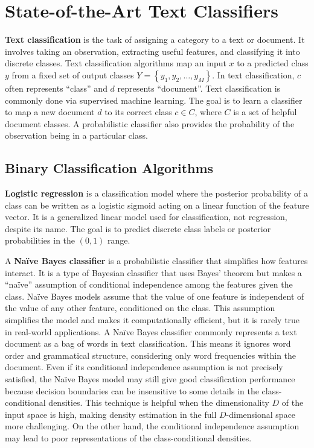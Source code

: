 \section{State-of-the-Art Text Classifiers}\label{sec:state-of-the-art-text-classifiers}
\textbf{Text classification} is the task of assigning a category to a text or document. It involves taking an observation, extracting useful features, and classifying it into discrete classes. Text classification algorithms map an input $x$ to a predicted class $y$ from a fixed set of output classes $Y = \left\{y_1, y_2, \dots, y_M\right\}$. In text classification, $c$ often represents ``class'' and $d$ represents ``document''. Text classification is commonly done via supervised machine learning. The goal is to learn a classifier to map a new document $d$ to its correct class $c \in C$, where $C$ is a set of helpful document classes. A probabilistic classifier also provides the probability of the observation being in a particular class. \cite{jurafsky2025}

\subsection{Binary Classification Algorithms}\label{subsec:binary-classification}
\textbf{Logistic regression} is a classification model where the posterior probability of a class can be written as a logistic sigmoid acting on a linear function of the feature vector. It is a generalized linear model used for classification, not regression, despite its name. The goal is to predict discrete class labels or posterior probabilities in the $\left(0, 1\right)$ range. \cite{bishop2006}

A \textbf{Naïve Bayes classifier} is a probabilistic classifier that simplifies how features interact. It is a type of Bayesian classifier that uses Bayes' theorem but makes a ``naïve'' assumption of conditional independence among the features given the class. Naïve Bayes models assume that the value of one feature is independent of the value of any other feature, conditioned on the class. This assumption simplifies the model and makes it computationally efficient, but it is rarely true in real-world applications. A Naïve Bayes classifier commonly represents a text document as a bag of words in text classification. This means it ignores word order and grammatical structure, considering only word frequencies within the document. Even if its conditional independence assumption is not precisely satisfied, the Naïve Bayes model may still give good classification performance because decision boundaries can be insensitive to some details in the class-conditional densities. This technique is helpful when the dimensionality $D$ of the input space is high, making density estimation in the full $D$-dimensional space more challenging. On the other hand, the conditional independence assumption may lead to poor representations of the class-conditional densities. \cite{bishop2006}

